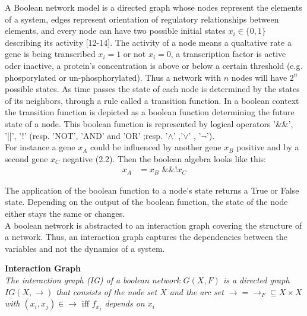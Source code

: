 A Boolean network model is a directed graph whose nodes represent the elements of a system, edges represent orientation of regulatory relationships between elements, and every node can have two possible initial states $x_{i}\in \{0,1\}$ describing its activity [12-14].
The activity of a node means a qualtative rate a gene is being transcribed $x_{i}=1$ or not $x_{i}=0$, a transcription factor is active oder inactive, a protein's concentration is above or below a certain threshold (e.g. phosporylated or un-phosphorylated). Thus a network with $n$ nodes will have $2^{n}$ possible states. As time passes the state of each node is determined by the states of its neighbors, through a rule called a transition function. In a boolean context the transition function is depicted as a boolean function determining the future state of a node. This boolean function is represented by logical operators '\&\&', '||', '!' (resp. 'NOT', 'AND' and 'OR' ;resp. '$\land$' ,'$\lor$' , '$\neg$'). \\
For instance a gene $x_{A}$ could be influenced by another gene $x_{B}$ positive and by a second gene $x_{C}$ negative (2.2). Then the boolean algebra looks like this:
\hspace{-10px}
\begin{equation}
\begin{split}
x_{A}& = x_{B} \text{ \&\&  !} x_{C} 
\end{split}
\end{equation}

The application of the boolean function to a node's state returns a True or False state. Depending on the output of the boolean function, the state of the node either stays the same or changes. 
\\
A boolean network is abstracted to an interaction graph covering the structure of a network. Thus, an interaction graph captures the dependencies between the variables and not the dynamics of a system.

\begin{defn}\textbf{Interaction Graph}\\
\textit{The interaction graph (\gls{IG}) of a boolean network $G(X,F)$ is a directed graph $IG(X,\rightarrow)$ that consists of the node set $X$ and the arc set $\rightarrow = \rightarrow _{F} \subseteq X \times X$ with $(x_{i},x_{j})\in \rightarrow \text{ iff }f_{x_{j}}$ depends on $x_{i}$ }
\end{defn} 

